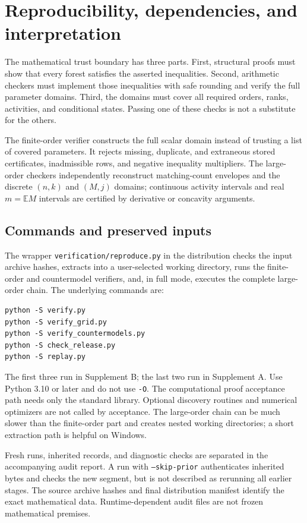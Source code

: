 \documentclass[11pt,a4paper]{article}
\theoremstyle{definition}\newtheorem{definition}[theorem]{Definition}
\theoremstyle{remark}\newtheorem{remark}[theorem]{Remark}
\newcommand{\E}{\mathbb E}
\begin{document}




\section{Reproducibility, dependencies, and interpretation}\label{sec:repro}
The mathematical trust boundary has three parts. First, structural proofs must show that every forest satisfies the asserted inequalities. Second, arithmetic checkers must implement those inequalities with safe rounding and verify the full parameter domains. Third, the domains must cover all required orders, ranks, activities, and conditional states. Passing one of these checks is not a substitute for the others.

The finite-order verifier constructs the full scalar domain instead of trusting a list of covered parameters. It rejects missing, duplicate, and extraneous stored certificates, inadmissible rows, and negative inequality multipliers. The large-order checkers independently reconstruct matching-count envelopes and the discrete $(n,k)$ and $(M,j)$ domains; continuous activity intervals and real $m=\E M$ intervals are certified by derivative or concavity arguments.

\subsection{Commands and preserved inputs}
The wrapper \texttt{verification/reproduce.py} in the distribution checks the input archive hashes, extracts into a user-selected working directory, runs the finite-order and countermodel verifiers, and, in full mode, executes the complete large-order chain. The underlying commands are:
\begin{verbatim}
python -S verify.py
python -S verify_grid.py
python -S verify_countermodels.py
python -S check_release.py
python -S replay.py
\end{verbatim}
The first three run in Supplement B; the last two run in Supplement A. Use Python 3.10 or later and do not use \texttt{-O}. The computational proof acceptance path needs only the standard library. Optional discovery routines and numerical optimizers are not called by acceptance. The large-order chain can be much slower than the finite-order part and creates nested working directories; a short extraction path is helpful on Windows.

Fresh runs, inherited records, and diagnostic checks are separated in the accompanying audit report. A run with \texttt{--skip-prior} authenticates inherited bytes and checks the new segment, but is not described as rerunning all earlier stages. The source archive hashes and final distribution manifest identify the exact mathematical data. Runtime-dependent audit files are not frozen mathematical premises.
\end{document}
